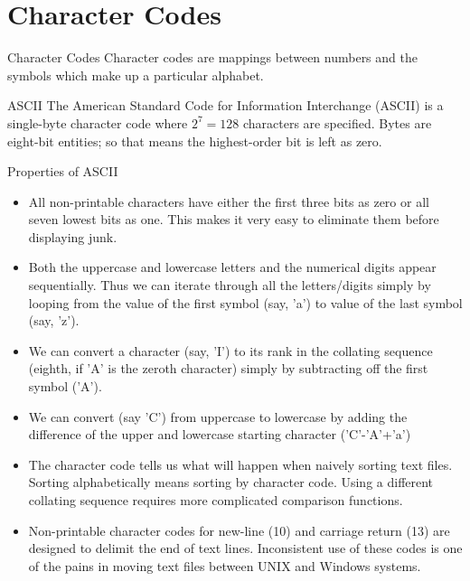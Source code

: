\documentclass{beamer}
\begin{document}
\section{Character Codes}
\begin{frame}{Character Codes}
  \alert{Character codes are mappings between numbers and the symbols which make up a particular alphabet.}
  \begin{block}{ASCII}
    The American Standard Code for Information Interchange (ASCII) is a single-byte character code where $2^7 = 128$ characters are specified.
    Bytes are eight-bit entities; so that means the highest-order bit is left as zero.
    
  \end{block}
  

\end{frame}

\begin{frame}{Properties of ASCII}
  \begin{itemize}
  \item All non-printable characters have either the first three bits as zero or all seven lowest bits as one. This makes it very easy to eliminate them before displaying junk.
  \item Both the uppercase and lowercase letters and the numerical digits appear sequentially. Thus we can iterate through all the letters/digits simply by looping from the value of the first symbol (say, 'a') to value of the last symbol (say, 'z'). 
  \item We can convert a character (say, 'I') to its rank in the collating sequence (eighth, if 'A' is the zeroth character) simply by subtracting off the first symbol ('A').
  \item We can convert (say 'C') from uppercase to lowercase by adding the difference of the upper and lowercase starting character ('C'-'A'+'a')
  \item The character code tells us what will happen when naively sorting text files. Sorting alphabetically means sorting by character code. Using a different collating sequence requires more complicated comparison functions.
  \item Non-printable character codes for new-line (10) and carriage return (13) are designed to delimit the end of text lines.
    Inconsistent use of these codes is one of the pains in moving text files between UNIX and Windows systems.
 \end{itemize}
\end{frame}
\end{document}
